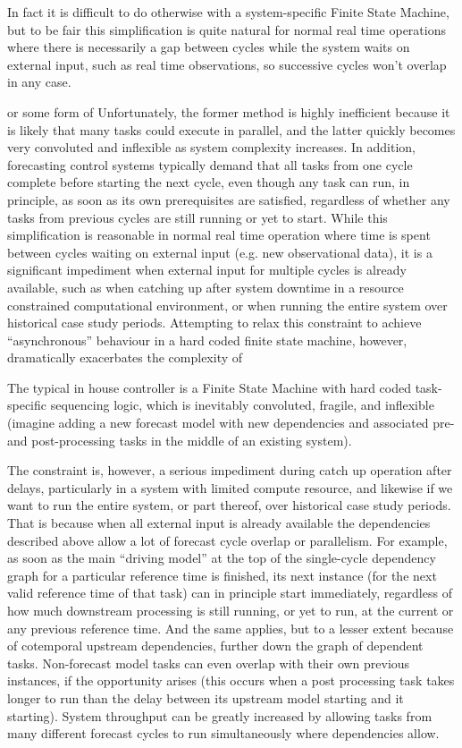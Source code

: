 \documentclass[11pt,a4paper]{article}
\begin{document}
In
fact it is difficult to do otherwise with a system-specific Finite State
Machine, but to be fair this simplification is quite natural for normal
real time operations where there is necessarily a gap between cycles
while the system waits on external input, such as real time
observations, so successive cycles won't overlap in any case.  

 or some form of Unfortunately, the former method is highly
inefficient because it is likely that many tasks could execute in
parallel, and the latter quickly becomes very convoluted and inflexible
as system complexity increases. In addition, forecasting control systems
typically demand that all tasks from one cycle complete before starting
the next cycle, even though any task can run, in principle, as soon as
its own prerequisites are satisfied, regardless of whether any tasks
from previous cycles are still running or yet to start.  While this
simplification is reasonable in normal real time operation where time is
spent between cycles waiting on external input (e.g. new observational
data), it is a significant impediment when external input for multiple
cycles is already available, such as when catching up after system
downtime in a resource constrained computational environment, or when
running the entire system over historical case study periods.
Attempting to relax this constraint to achieve ``asynchronous''
behaviour in a hard coded finite state machine, however, dramatically
exacerbates the complexity of 




The typical in house controller is a Finite
State Machine with hard coded task-specific sequencing logic, which is
inevitably convoluted, fragile, and inflexible (imagine adding a new
forecast model with new dependencies and associated pre- and
post-processing tasks in the middle of an existing system).

The
constraint is, however, a serious impediment during catch up operation
after delays, particularly in a system with limited compute resource,
and likewise if we want to run the entire system, or part thereof, over
historical case study periods. That is because when all external input
is already available the dependencies described above allow a lot of
forecast cycle overlap or parallelism.  For example, as soon as the main
``driving model'' at the top of the single-cycle dependency graph for a
particular reference time is finished, its next instance (for the next
valid reference time of that task) can in principle start immediately,
regardless of how much downstream processing is still running, or yet to
run, at the current or any previous reference time.  And the same
applies, but to a lesser extent because of cotemporal upstream
dependencies, further down the graph of dependent tasks. Non-forecast
model tasks can even overlap with their own previous instances, if the
opportunity arises (this occurs when a post processing task takes longer
to run than the delay between its upstream model starting and it
starting).  System throughput can be greatly increased by allowing tasks
from many different forecast cycles to run simultaneously where
dependencies allow.
\end{document}
